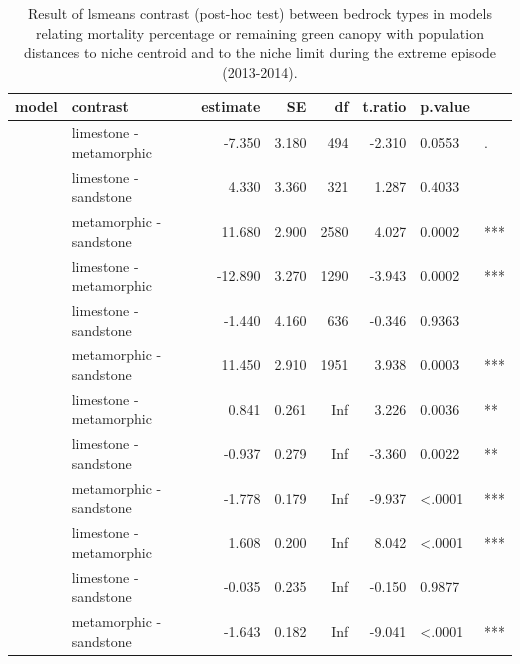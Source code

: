 \documentclass[11pt,twoside]{reedthesis}
\begin{document}
\begin{landscape}\begin{table}[H]

\caption[Result of lsmeans contrast between bedrock types in mortality and RGC models]{\label{tab:unnamed-chunk-33}Result of lsmeans contrast (post-hoc test) between bedrock types in models relating mortality percentage or remaining green canopy with population distances to niche centroid and to the niche limit during the extreme episode (2013-2014).}
\centering
\fontsize{8}{10}\selectfont
\begin{tabular}[t]{>{\raggedright\arraybackslash}p{20em}lrrrrll}
\toprule
model & contrast & estimate & SE & df & t.ratio & p.value & \\
\midrule
 & limestone - metamorphic & -7.350 & 3.180 & 494 & -2.310 & 0.0553 & .\\
\cmidrule{2-8}
 & limestone - sandstone & 4.330 & 3.360 & 321 & 1.287 & 0.4033 & \\
\cmidrule{2-8}
\multirow{-3}{20em}{\raggedright\arraybackslash $rgc ~ bedrock + centroid\,distance + bedrock : centroid\,distance$} & metamorphic - sandstone & 11.680 & 2.900 & 2580 & 4.027 & 0.0002 & ***\\
\cmidrule{1-8}
 & limestone - metamorphic & -12.890 & 3.270 & 1290 & -3.943 & 0.0002 & ***\\
\cmidrule{2-8}
 & limestone - sandstone & -1.440 & 4.160 & 636 & -0.346 & 0.9363 & \\
\cmidrule{2-8}
\multirow{-3}{20em}{\raggedright\arraybackslash $rgc ~ bedrock + limit distance:in\,out$} & metamorphic - sandstone & 11.450 & 2.910 & 1951 & 3.938 & 0.0003 & ***\\
\cmidrule{1-8}
 & limestone - metamorphic & 0.841 & 0.261 & Inf & 3.226 & 0.0036 & **\\
\cmidrule{2-8}
 & limestone - sandstone & -0.937 & 0.279 & Inf & -3.360 & 0.0022 & **\\
\cmidrule{2-8}
\multirow{-3}{20em}{\raggedright\arraybackslash $mortality\,per ~ bedrock + centroid\,distance + bedrock :centroid\,distance$} & metamorphic - sandstone & -1.778 & 0.179 & Inf & -9.937 & <.0001 & ***\\
\cmidrule{1-8}
 & limestone - metamorphic & 1.608 & 0.200 & Inf & 8.042 & <.0001 & ***\\
\cmidrule{2-8}
 & limestone - sandstone & -0.035 & 0.235 & Inf & -0.150 & 0.9877 & \\
\cmidrule{2-8}
\multirow{-3}{20em}{\raggedright\arraybackslash $mortality\,per ~ bedrcok + limit\,distance:in\,out$} & metamorphic -sandstone & -1.643 & 0.182 & Inf & -9.041 & <.0001 & ***\\
\bottomrule
\end{tabular}
\end{table}
\end{landscape}
\end{document}
